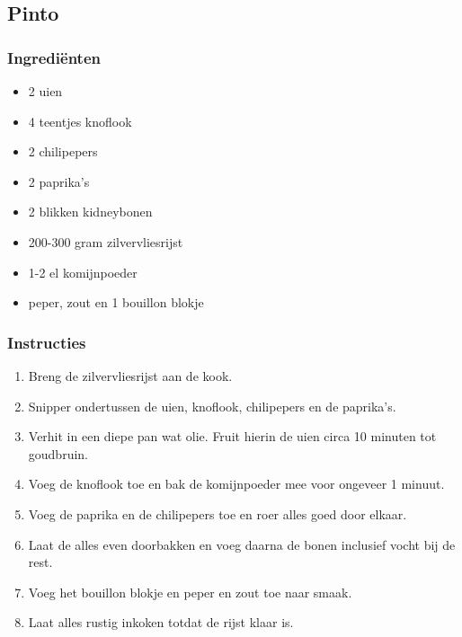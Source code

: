 \subsection{Pinto}

\subsubsection*{Ingrediënten}
\begin{multicols}{2}
    \begin{itemize}
        \item 2 uien
        \item 4 teentjes knoflook
        \item 2 chilipepers
        \item 2 paprika's
        \item 2 blikken kidneybonen
        \item 200-300 gram zilvervliesrijst
        \item 1-2 el komijnpoeder
        \item peper, zout en 1 bouillon blokje
    \end{itemize}
\end{multicols}

\subsubsection*{Instructies}
\begin{multicols}{2}
    \begin{enumerate}
        \item Breng de zilvervliesrijst aan de kook.
        \item Snipper ondertussen de uien, knoflook, chilipepers en de paprika's.
        \item Verhit in een diepe pan wat olie. Fruit hierin de uien circa 10 minuten tot goudbruin.
        \item Voeg de knoflook toe en bak de komijnpoeder mee voor ongeveer 1 minuut.
        \item Voeg de paprika en de chilipepers toe en roer alles goed door elkaar.
        \item Laat de alles even doorbakken en voeg daarna de bonen inclusief vocht bij de rest.
        \item Voeg het bouillon blokje en peper en zout toe naar smaak.
        \item Laat alles rustig inkoken totdat de rijst klaar is.
    \end{enumerate}
\end{multicols}